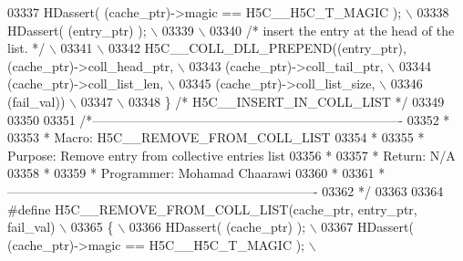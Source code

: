 \begin{DoxyCode}
03337 \textcolor{preprocessor}{    HDassert( (cache\_ptr)->magic == H5C\_\_H5C\_T\_MAGIC );                 \(\backslash\)}
03338 \textcolor{preprocessor}{    HDassert( (entry\_ptr) );                                            \(\backslash\)}
03339 \textcolor{preprocessor}{                                                                        \(\backslash\)}
03340 \textcolor{preprocessor}{    }\textcolor{comment}{/* insert the entry at the head of the list. */}\textcolor{preprocessor}{                     \(\backslash\)}
03341 \textcolor{preprocessor}{                                                                        \(\backslash\)}
03342 \textcolor{preprocessor}{    H5C\_\_COLL\_DLL\_PREPEND((entry\_ptr), (cache\_ptr)->coll\_head\_ptr,      \(\backslash\)}
03343 \textcolor{preprocessor}{                          (cache\_ptr)->coll\_tail\_ptr,                   \(\backslash\)}
03344 \textcolor{preprocessor}{                          (cache\_ptr)->coll\_list\_len,                   \(\backslash\)}
03345 \textcolor{preprocessor}{                          (cache\_ptr)->coll\_list\_size,                  \(\backslash\)}
03346 \textcolor{preprocessor}{                          (fail\_val))                                   \(\backslash\)}
03347 \textcolor{preprocessor}{                                                                        \(\backslash\)}
03348 \textcolor{preprocessor}{\} }\textcolor{comment}{/* H5C\_\_INSERT\_IN\_COLL\_LIST */}\textcolor{preprocessor}{}
03349 
03350 
03351 \textcolor{comment}{/*-------------------------------------------------------------------------}
03352 \textcolor{comment}{ *}
03353 \textcolor{comment}{ * Macro:   H5C\_\_REMOVE\_FROM\_COLL\_LIST}
03354 \textcolor{comment}{ *}
03355 \textcolor{comment}{ * Purpose:     Remove entry from collective entries list}
03356 \textcolor{comment}{ *}
03357 \textcolor{comment}{ * Return:      N/A}
03358 \textcolor{comment}{ *}
03359 \textcolor{comment}{ * Programmer:  Mohamad Chaarawi}
03360 \textcolor{comment}{ *}
03361 \textcolor{comment}{ *-------------------------------------------------------------------------}
03362 \textcolor{comment}{ */}
03363 
03364 \textcolor{preprocessor}{#define H5C\_\_REMOVE\_FROM\_COLL\_LIST(cache\_ptr, entry\_ptr, fail\_val)      \(\backslash\)}
03365 \textcolor{preprocessor}{\{                                                                       \(\backslash\)}
03366 \textcolor{preprocessor}{    HDassert( (cache\_ptr) );                                            \(\backslash\)}
03367 \textcolor{preprocessor}{    HDassert( (cache\_ptr)->magic == H5C\_\_H5C\_T\_MAGIC );                 \(\backslash\)}

\end{DoxyCode}
